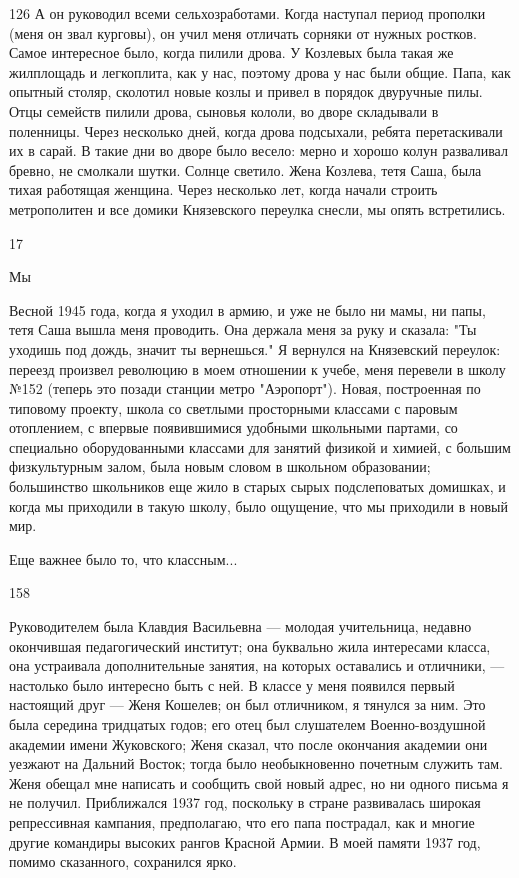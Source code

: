 126
А он руководил всеми сельхозработами. Когда наступал период прополки (меня он звал курговы), он учил меня отличать сорняки от нужных ростков. Самое интересное было, когда пилили дрова. У Козлевых была такая же жилплощадь и легкоплита, как у нас, поэтому дрова у нас были общие. Папа, как опытный столяр, сколотил новые козлы и привел в порядок двуручные пилы. Отцы семейств пилили дрова, сыновья кололи, во дворе складывали в поленницы. Через несколько дней, когда дрова подсыхали, ребята перетаскивали их в сарай. В такие дни во дворе было весело: мерно и хорошо колун разваливал бревно, не смолкали шутки. Солнце светило. Жена Козлева, тетя Саша, была тихая работящая женщина. Через несколько лет, когда начали строить метрополитен и все домики Князевского переулка снесли, мы опять встретились.

17

Мы

Весной 1945 года, когда я уходил в армию, и уже не было ни мамы, ни папы, тетя Саша вышла меня проводить. Она держала меня за руку и сказала: "Ты уходишь под дождь, значит ты вернешься." Я вернулся на Князевский переулок: переезд произвел революцию в моем отношении к учебе, меня перевели в школу №152 (теперь это позади станции метро "Аэропорт"). Новая, построенная по типовому проекту, школа со светлыми просторными классами с паровым отоплением, с впервые появившимися удобными школьными партами, со специально оборудованными классами для занятий физикой и химией, с большим физкультурным залом, была новым словом в школьном образовании; большинство школьников еще жило в старых сырых подслеповатых домишках, и когда мы приходили в такую школу, было ощущение, что мы приходили в новый мир.

Еще важнее было то, что классным...

158

Руководителем была Клавдия Васильевна — молодая учительница, недавно окончившая педагогический институт; она буквально жила интересами класса, она устраивала дополнительные занятия, на которых оставались и отличники, — настолько было интересно быть с ней. В классе у меня появился первый настоящий друг — Женя Кошелев; он был отличником, я тянулся за ним. Это была середина тридцатых годов; его отец был слушателем Военно-воздушной академии имени Жуковского; Женя сказал, что после окончания академии они уезжают на Дальний Восток; тогда было необыкновенно почетным служить там. Женя обещал мне написать и сообщить свой новый адрес, но ни одного письма я не получил. Приближался 1937 год, поскольку в стране развивалась широкая репрессивная кампания, предполагаю, что его папа пострадал, как и многие другие командиры высоких рангов Красной Армии. В моей памяти 1937 год, помимо сказанного, сохранился ярко.

